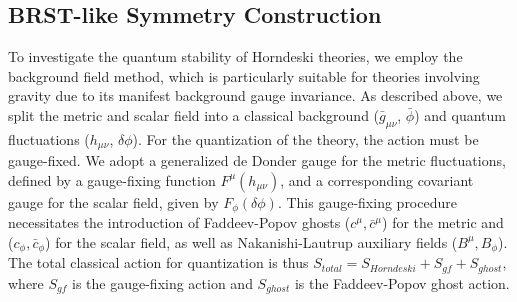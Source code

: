 \documentclass[twocolumn]{aastex631}
\begin{document}
\subsection{BRST-like Symmetry Construction}

To investigate the quantum stability of Horndeski theories, we employ the background field method, which is particularly suitable for theories involving gravity due to its manifest background gauge invariance. As described above, we split the metric and scalar field into a classical background ($\bar{g}_{\mu\nu}$, $\bar{\phi}$) and quantum fluctuations ($h_{\mu\nu}$, $\delta\phi$).
For the quantization of the theory, the action must be gauge-fixed. We adopt a generalized de Donder gauge for the metric fluctuations, defined by a gauge-fixing function $F^\mu(h_{\mu\nu})$, and a corresponding covariant gauge for the scalar field, given by $F_\phi(\delta\phi)$. This gauge-fixing procedure necessitates the introduction of Faddeev-Popov ghosts ($c^\mu, \bar{c}^\mu$) for the metric and ($c_\phi, \bar{c}_\phi$) for the scalar field, as well as Nakanishi-Lautrup auxiliary fields ($B^\mu, B_\phi$). The total classical action for quantization is thus $S_{total} = S_{Horndeski} + S_{gf} + S_{ghost}$, where $S_{gf}$ is the gauge-fixing action and $S_{ghost}$ is the Faddeev-Popov ghost action.
\end{document}
